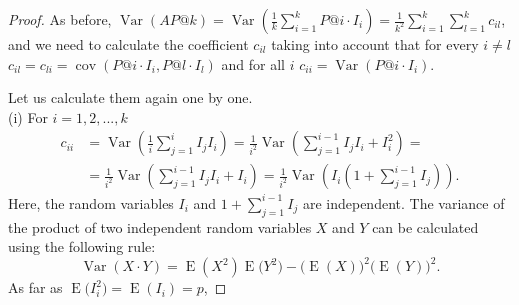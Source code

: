 \documentclass{tpms-l}
\theoremstyle{definition}
\theoremstyle{remark}
\numberwithin{equation}{section}
\begin{document}
\begin{proof}
As before,   $\operatorname{Var}(AP@k) = \operatorname{Var}\left(\frac{1}{k} \sum_{i=1}^k P@i \cdot I_i\right) = \frac{1}{k^2} \sum_{i=1}^k \sum_{l=1}^k c_{il}$, and we need to calculate  the coefficient $c_{il}$ taking into account that  for every $i\neq l$
$c_{il} = c_{li} = \operatorname{cov}(P@i \cdot I_i, P@l \cdot I_l)$
and  for all $i$ 
$c_{ii} = \operatorname{Var}(P@i \cdot I_i).$

Let us calculate them again one by one. \\
(i)
For $i=1,2,...,k$
\begin{equation*}
\begin{split}
c_{ii}& = \operatorname{Var} \left( \frac{1}{i} \sum_{j=1}^{i} I_j I_i \right) = \frac{1}{i^2} \operatorname{Var} \left( \sum_{j=1}^{i-1} I_j I_i + I_i^2 \right)=\\
&=\frac{1}{i^2} \operatorname{Var} \left( \sum_{j=1}^{i-1} I_j I_i + I_i \right) = \frac{1}{i^2} \operatorname{Var} \left( I_i \left( 1 + \sum_{j=1}^{i-1} I_j \right) \right).
\end{split}
\end{equation*}
Here,  the random variables $I_{i}$ and $1 + \sum_{j=1}^{i-1} I_j$ are independent. The variance of the product of two independent random variables $X$ and $Y$ can be calculated using the following rule:
$$
\operatorname{Var}(X \cdot Y) = \operatorname{E}(X^2)\operatorname{E}\big(Y^2\big) - \big(\operatorname{E}(X))^2(\operatorname{E}(Y)\big)^2.
$$
As far as $\operatorname{E}\big(I_i^2\big) = \operatorname{E}(I_i) = p$, 


\end{proof}
\end{document}
